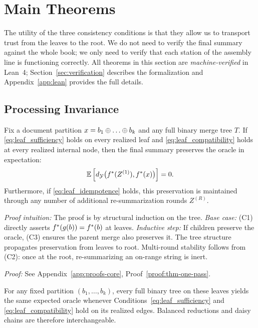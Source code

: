 \section{Main Theorems}\label{sec:theorems}

The utility of the three consistency conditions is that they allow us to transport trust from the leaves to the root. We do not need to verify the final summary against the whole book; we only need to verify that each station of the assembly line is functioning correctly. All theorems in this section are \emph{machine-verified} in Lean~4; Section~\ref{sec:verification} describes the formalization and Appendix~\ref{app:lean} provides the full details.

\subsection{Processing Invariance}

\begin{theorem}\label{thm:one-pass}
Fix a document partition $x = b_1 \concat \dots \concat b_k$ and any full binary merge tree $T$. If \ref{eq:leaf_sufficiency} holds on every realized leaf and \ref{eq:leaf_compatibility} holds at every realized internal node, then the final summary preserves the oracle in expectation:
\[
\mathbb{E}\left[d_{\mathcal{Y}}\big(f^{\ast}(Z^{(1)}), f^{\ast}(x)\big)\right] = 0.
\]
Furthermore, if \ref{eq:leaf_idempotence} holds, this preservation is maintained through any number of additional re-summarization rounds $Z^{(R)}$.
\end{theorem}

\noindent\textit{Proof intuition:} The proof is by structural induction on the tree. \emph{Base case:} (C1) directly asserts $f^{\ast}(g(b)) = f^{\ast}(b)$ at leaves. \emph{Inductive step:} If children preserve the oracle, (C3) ensures the parent merge also preserves it. The tree structure propagates preservation from leaves to root. Multi-round stability follows from (C2): once at the root, re-summarizing an on-range string is inert.

\noindent\textit{Proof:} See Appendix~\ref{app:proofs-core}, Proof~\ref{proof:thm-one-pass}.

\begin{corollary}\label{cor:schedule}
For any fixed partition $(b_1, \ldots, b_k)$, every full binary tree on these leaves yields the same expected oracle whenever Conditions~\eqref{eq:leaf_sufficiency} and \eqref{eq:leaf_compatibility} hold on its realized edges. Balanced reductions and daisy chains are therefore interchangeable.
\end{corollary}

